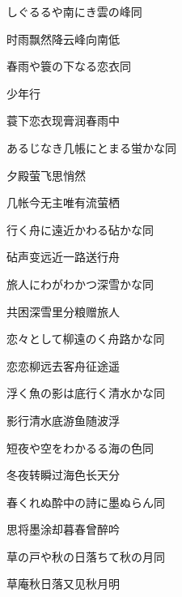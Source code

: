 \begin{haiku}
    {\FH しぐるるや南にき雲の峰}\hfill{\FH 同}

    {\FK 时雨飘然降云峰向南低}
\end{haiku}

\begin{haiku}
    {\FH 春雨や簑の下なる恋衣}\hfill{\FH 同}

    {\FK 少年行}

    {\FK 蓑下恋衣现膏润春雨中}
\end{haiku}

\begin{haiku}
    {\FH あるじなき几帳にとまる蛍かな}\hfill{\FH 同}

    {\FK 夕殿萤飞思悄然}

    {\FK 几帐今无主唯有流萤栖}
\end{haiku}

\begin{haiku}
    {\FH 行く舟に遠近かわる砧かな}\hfill{\FH 同}

    {\FK 砧声变远近一路送行舟}
\end{haiku}

\begin{haiku}
    {\FH 旅人にわがわかつ深雪かな}\hfill{\FH 同}

    {\FK 共困深雪里分粮赠旅人}
\end{haiku}

\begin{haiku}
    {\FH 恋々として柳遠のく舟路かな}\hfill{\FH 同}

    {\FK 恋恋柳远去客舟征途遥}
\end{haiku}

\begin{haiku}
    {\FH 浮く魚の影は底行く清水かな}\hfill{\FH 同}

    {\FK 影行清水底游鱼随波浮}
\end{haiku}

\begin{haiku}
    {\FH 短夜や空をわかるる海の色}\hfill{\FH 同}

    {\FK 冬夜转瞬过海色长天分}
\end{haiku}

\begin{haiku}
    {\FH 春くれぬ酔中の詩に墨ぬらん}\hfill{\FH 同}

    {\FK 思将墨涂却暮春曾醉吟}
\end{haiku}

\begin{haiku}
    {\FH 草の戸や秋の日落ちて秋の月}\hfill{\FH 同}

    {\FK 草庵秋日落又见秋月明}
\end{haiku}

